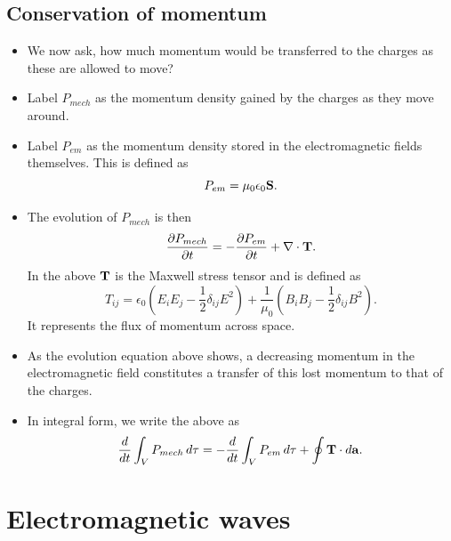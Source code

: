 \documentclass[a4paper,11pt]{report}
\begin{document}
\subsection{Conservation of momentum}
\begin{itemize}
    \item We now ask, how much momentum would be transferred to the charges as these are allowed to move?
    \item Label $P_{mech}$ as the momentum density gained by the charges as they move around.
    \item Label $P_{em}$ as the momentum density stored in the electromagnetic fields themselves. This is defined as 
    \begin{equation}
        P_{em} = \mu_0 \epsilon_0 \mathbf{S}.
    \end{equation}
    \item The evolution of $P_{mech}$ is then
    \begin{equation}
        \frac{\partial P_{mech}}{\partial t} = -\frac{\partial P_{em}}{\partial t} + \nabla \cdot \mathbf{T}.
    \end{equation}
    In the above $\mathbf{T}$ is the Maxwell stress tensor and is defined as 
    \begin{equation}
        T_{ij} = \epsilon_0 \left ( E_i E_j - \frac{1}{2} \delta_{ij} E^2 \right ) + \frac{1}{\mu_0} \left ( B_i B_j - \frac{1}{2} \delta_{ij} B^2 \right ).
    \end{equation}
    It represents the flux of momentum across space.
    \item As the evolution equation above shows, a decreasing momentum in the electromagnetic field constitutes a transfer of this lost momentum to that of the charges. 
    \item In integral form, we write the above as 
    \begin{equation}
        \frac{d}{dt} \int_V P_{mech} \, d\tau = -\frac{d}{dt} \int_V P_{em} \, d\tau + \oint \mathbf{T} \cdot d\mathbf{a}.
    \end{equation}
\end{itemize}
\section{Electromagnetic waves}
\end{document}
